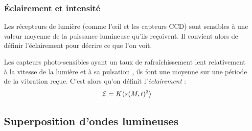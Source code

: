 \documentclass[11pt,a4paper,fleqn,pdftex]{report}
\begin{document}
\subsubsection{Éclairement et intensité} %
\label{ssub:eclairement_et_intensite}
Les récepteurs de lumière (comme l'\oe{}il et les capteurs CCD) sont sensibles à une valeur moyenne de la puissance lumineuse qu'ils reçoivent. Il convient alors de définir l'éclairement pour décrire ce que l'on voit.
\begin{dfn}[Éclairement]
Les capteurs photo-sensibles ayant un taux de rafraîchissement lent relativement à la vitesse de la lumière et à sa pulsation \pulsation{}, ils font une moyenne sur une période de la vibration reçue. C'est alors qu'on définit l'\emph{éclairement} : 
\begin{equation}\label{eclairement}
\mathcal{E} = K \langle s_{}(M,t)^2 \rangle
\end{equation}
\end{dfn}
\subsection{Superposition d'ondes lumineuses} %
\label{sub:superposition_ondes_lumineuses}
\end{document}
